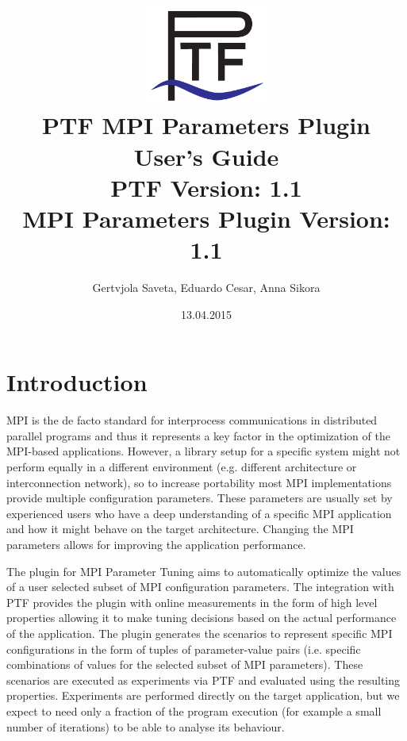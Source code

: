 \documentclass[11pt,a4paper, oneside]{book} %
\begin{document}
\title{\includegraphics[width=4cm]{../images/Ptf_LogoBlau}\\ \vspace{1cm}
\textsf{\bf \huge PTF MPI Parameters Plugin\\User's Guide }\\
       \normalsize PTF Version: 1.1\\
       MPI Parameters Plugin Version: 1.1}
\author{Gertvjola Saveta, Eduardo Cesar, Anna Sikora}
\date{13.04.2015}

\maketitle
\tableofcontents


\chapter{Introduction}

MPI is the de facto standard for interprocess communications in distributed parallel
programs and thus it represents a key factor in the optimization of the MPI-based applications.
However, a library setup for a specific system might not perform equally in a
different environment (e.g. different architecture or interconnection network), so to increase
portability most MPI implementations provide multiple configuration parameters.
These parameters are usually set by experienced users who have a deep understanding of
a specific MPI application and how it might behave on the target architecture. Changing
the MPI parameters allows for improving the application performance.

The plugin for MPI Parameter Tuning aims to automatically optimize the values of a
user selected subset of MPI configuration parameters. The integration with PTF provides
the plugin with online measurements in the form of high level properties allowing it to
make tuning decisions based on the actual performance of the application. The plugin
generates the scenarios to represent specific MPI configurations in the form of tuples of
parameter-value pairs (i.e. specific combinations of values for the selected subset of MPI
parameters). These scenarios are executed as experiments via PTF and evaluated using
the resulting properties. Experiments are performed directly on the target application, but
we expect to need only a fraction of the program execution (for example a small number
of iterations) to be able to analyse its behaviour.
\end{document}
